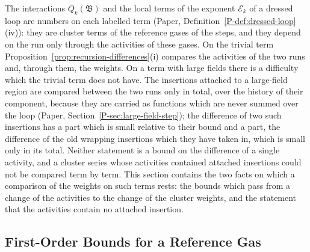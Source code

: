 \documentclass[11pt]{preprint}
\numberwithin{equation}{section}
\theoremstyle{definition}
\theoremstyle{remark}
\theoremstyle{plain}
\begin{document}
The interactions $Q_k(\mathfrak B)$ and the local terms of the exponent $\mathcal E_k$ of a dressed loop are numbers on each labelled term (Paper, Definition~\ref{P-def:dressed-loop}(iv)): they are cluster terms of the reference gases of the steps, and they depend on the run only through the activities of these gases. On the trivial term Proposition~\ref{prop:recursion-differences}(i) compares the activities of the two runs and, through them, the weights. On a term with large fields there is a difficulty which the trivial term does not have. The insertions attached to a large-field region are compared between the two runs only in total, over the history of their component, because they are carried as functions which are never summed over the loop (Paper, Section~\ref{P-sec:large-field-step}); the difference of two such insertions has a part which is small relative to their bound and a part, the difference of the old wrapping insertions which they have taken in, which is small only in its total. Neither statement is a bound on the difference of a single activity, and a cluster series whose activities contained attached insertions could not be compared term by term. This section contains the two facts on which a comparison of the weights on such terms rests: the bounds which pass from a change of the activities to the change of the cluster weights, and the statement that the activities contain no attached insertion.

\subsection{First-Order Bounds for a Reference Gas}
\end{document}
